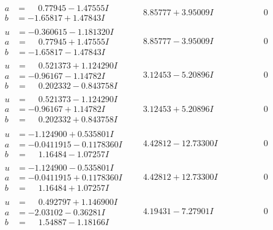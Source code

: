 \documentclass[1p]{elsarticle_modified}
\theoremstyle{definition}
\begin{document}
$$\begin{array}{c|c|c}
\begin{aligned}
a &= \phantom{-}0.77945 - 1.47555 I \\
b &= -1.65817 + 1.47843 I\end{aligned}
 & \phantom{-}8.85777 + 3.95009 I & \phantom{-0.000000 } 0 \\ \hline\begin{aligned}
u &= -0.360615 - 1.181320 I \\
a &= \phantom{-}0.77945 + 1.47555 I \\
b &= -1.65817 - 1.47843 I\end{aligned}
 & \phantom{-}8.85777 - 3.95009 I & \phantom{-0.000000 } 0 \\ \hline\begin{aligned}
u &= \phantom{-}0.521373 + 1.124290 I \\
a &= -0.96167 - 1.14782 I \\
b &= \phantom{-}0.202332 - 0.843758 I\end{aligned}
 & \phantom{-}3.12453 - 5.20896 I & \phantom{-0.000000 } 0 \\ \hline\begin{aligned}
u &= \phantom{-}0.521373 - 1.124290 I \\
a &= -0.96167 + 1.14782 I \\
b &= \phantom{-}0.202332 + 0.843758 I\end{aligned}
 & \phantom{-}3.12453 + 5.20896 I & \phantom{-0.000000 } 0 \\ \hline\begin{aligned}
u &= -1.124900 + 0.535801 I \\
a &= -0.0411915 - 0.1178360 I \\
b &= \phantom{-}1.16484 - 1.07257 I\end{aligned}
 & \phantom{-}4.42812 - 12.73300 I & \phantom{-0.000000 } 0 \\ \hline\begin{aligned}
u &= -1.124900 - 0.535801 I \\
a &= -0.0411915 + 0.1178360 I \\
b &= \phantom{-}1.16484 + 1.07257 I\end{aligned}
 & \phantom{-}4.42812 + 12.73300 I & \phantom{-0.000000 } 0 \\ \hline\begin{aligned}
u &= \phantom{-}0.492797 + 1.146900 I \\
a &= -2.03102 - 0.36281 I \\
b &= \phantom{-}1.54887 - 1.18166 I\end{aligned}
 & \phantom{-}4.19431 - 7.27901 I & \phantom{-0.000000 } 0 \\ \hline\begin{aligned}

\end{aligned}
\end{array}$$
\end{document}
